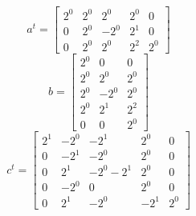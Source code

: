 \documentclass{article}%
\begin{document}
\[%
a^{t} = \left[\begin{matrix}2^{0} & 2^{0} & 2^{0} & 2^{0} & 0\\0 & 2^{0} & - 2^{0} & 2^{1} & 0\\0 & 2^{0} & 2^{0} & 2^{2} & 2^{0}\end{matrix}\right]%
\]%
\[%
b = \left[\begin{matrix}2^{0} & 0 & 0\\2^{0} & 2^{0} & 2^{0}\\2^{0} & - 2^{0} & 2^{0}\\2^{0} & 2^{1} & 2^{2}\\0 & 0 & 2^{0}\end{matrix}\right]%
\]%
\[%
c^{t} = \left[\begin{matrix}2^{1} & - 2^{0} & - 2^{1} & 2^{0} & 0\\0 & - 2^{1} & - 2^{0} & 2^{0} & 0\\0 & 2^{1} & - 2^{0} - 2^{1} & 2^{0} & 0\\0 & - 2^{0} & 0 & 2^{0} & 0\\0 & 2^{1} & - 2^{0} & - 2^{1} & 2^{0}\end{matrix}\right]%
\]%
\end{document}
